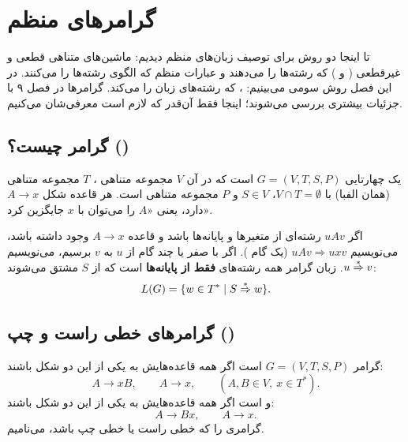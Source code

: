 \chapter{گرامرهای منظم}

تا اینجا دو روش برای توصیف زبان‌های منظم دیدیم: ماشین‌های متناهی قطعی و غیرقطعی ( و ) که رشته‌ها را  می‌دهند و عبارات منظم که الگوی رشته‌ها را  می‌کنند. در این فصل روش سومی می‌بینیم: ، که رشته‌های زبان را  می‌کند. گرامرها در فصل ۹ با جزئیات بیشتری بررسی می‌شوند؛ اینجا فقط آن‌قدر که لازم است معرفی‌شان می‌کنیم.

\section{گرامر چیست؟ ()}

\begin{definition}[گرامر]
یک  چهارتایی $G=(V,T,S,P)$ است که در آن $V$ مجموعه متناهی ، $T$ مجموعه متناهی  (همان الفبا) با $V\cap T=\emptyset$، $S\in V$  و $P$ مجموعه متناهی  است. هر قاعده شکل $A\to x$ دارد، یعنی «$A$ را می‌توان با $x$ جایگزین کرد».
\end{definition}

اگر $uAv$ رشته‌ای از متغیرها و پایانه‌ها باشد و قاعده $A\to x$ وجود داشته باشد، می‌نویسیم $uAv\Rightarrow uxv$ (یک گام ). اگر با صفر یا چند گام از $u$ به $v$ برسیم، می‌نویسیم $u\overset{*}{\Rightarrow} v$. زبان گرامر همه رشته‌های \textbf{فقط از پایانه‌ها} است که از $S$ مشتق می‌شوند:
\[L(G)=\{w\in T^*\mid S\overset{*}{\Rightarrow} w\}.\]

\section{گرامرهای خطی راست و چپ ()}

\begin{definition}
گرامر $G=(V,T,S,P)$  است اگر همه قاعده‌هایش به یکی از این دو شکل باشند:
\[A\to xB,\qquad A\to x,\qquad (A,B\in V,\ x\in T^*).\]
و  است اگر همه قاعده‌هایش به یکی از این دو شکل باشند:
\[A\to Bx,\qquad A\to x.\]
گرامری را که خطی راست یا خطی چپ باشد،  می‌نامیم.
\end{definition}

